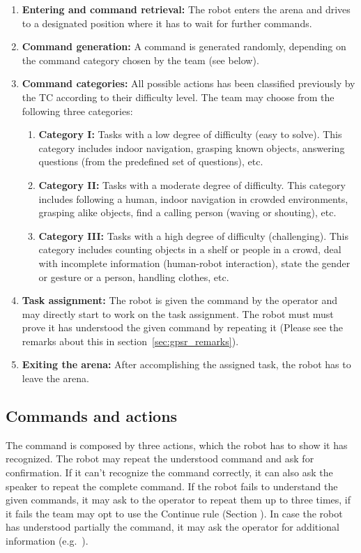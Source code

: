 \begin{enumerate}
	\item \textbf{Entering and command retrieval:} The robot enters the arena and drives to a designated position where it has to wait for further commands.
	\item \textbf{Command generation:} A command is generated randomly, depending on the command category chosen by the team (see below). \\

	\item \textbf{Command categories:} All possible actions has been classified previously by the TC according to their difficulty level. The team may choose from the following three categories:
	\begin{enumerate}
		\item \textbf{Category I:} Tasks with a low degree of difficulty (easy to solve). This category includes indoor navigation, grasping known objects, answering questions (from the predefined set of questions), etc.
		\item \textbf{Category II:} Tasks with a moderate degree of difficulty. This category includes following a human, indoor navigation in crowded environments, grasping alike objects, find a calling person (waving or shouting), etc.
		\item \textbf{Category III:} Tasks with a high degree of difficulty (challenging). This category includes counting objects in a shelf or people in a crowd, deal with incomplete information (human-robot interaction), state the gender or gesture or a person, handling clothes, etc.
	\end{enumerate}

	\item \textbf{Task assignment:} The robot is given the command by the operator and may directly start to work on the task assignment. The robot must must prove it has understood the given command by repeating it (Please see the remarks about this in section~\ref{sec:gpsr_remarks}).
	\item \textbf{Exiting the arena:} After accomplishing the assigned task, the robot has to leave the arena.
\end{enumerate}

\subsection{Commands and actions}
The command is composed by three actions, which the robot has to show it has recognized. The robot may repeat the understood command and ask for confirmation. If it can't recognize the command correctly, it can also ask the speaker to repeat the complete command. If the robot fails to understand the given commands, it may ask to the operator to repeat them up to three times, if it fails the team may opt to use the Continue rule (Section ). In case the robot has understood partially the command, it may ask the operator for additional information (e.g.~).

